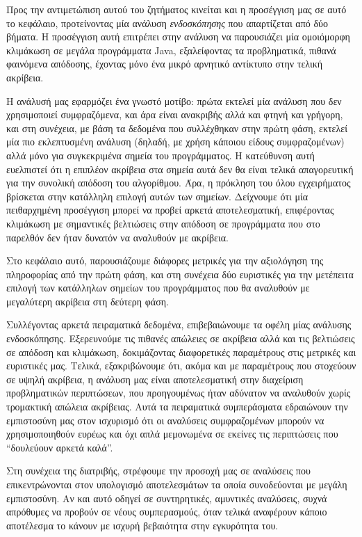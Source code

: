 Προς την αντιμετώπιση αυτού του ζητήματος κινείται και η προσέγγιση μας σε αυτό το κεφάλαιο, προτείνοντας μία ανάλυση \emph{ενδοσκόπησης} που απαρτίζεται από δύο βήματα. Η προσέγγιση αυτή επιτρέπει στην ανάλυση να παρουσιάζει μία ομοιόμορφη κλιμάκωση σε μεγάλα προγράμματα {\en Java}, εξαλείφοντας τα προβληματικά, πιθανά φαινόμενα απόδοσης, έχοντας μόνο ένα μικρό αρνητικό αντίκτυπο στην τελική ακρίβεια.

Η ανάλυσή μας εφαρμόζει ένα γνωστό μοτίβο: πρώτα εκτελεί μία ανάλυση που δεν χρησιμοποιεί συμφραζόμενα, και άρα είναι ανακριβής αλλά και φτηνή και γρήγορη, και στη συνέχεια, με βάση τα δεδομένα που συλλέχθηκαν στην πρώτη φάση, εκτελεί μία πιο εκλεπτυσμένη ανάλυση (δηλαδή, με χρήση κάποιου είδους συμφραζομένων) αλλά μόνο για συγκεκριμένα σημεία του προγράμματος. Η κατεύθυνση αυτή ευελπιστεί ότι η επιπλέον ακρίβεια στα σημεία αυτά δεν θα είναι τελικά απαγορευτική για την συνολική απόδοση του αλγορίθμου. Άρα, η πρόκληση του όλου εγχειρήματος βρίσκεται στην κατάλληλη επιλογή αυτών των σημείων. Δείχνουμε ότι μία πειθαρχημένη προσέγγιση μπορεί να προβεί αρκετά αποτελεσματική, επιφέροντας κλιμάκωση με σημαντικές βελτιώσεις στην απόδοση σε προγράμματα που στο παρελθόν δεν ήταν δυνατόν να αναλυθούν με ακρίβεια.

Στο κεφάλαιο αυτό, παρουσιάζουμε διάφορες μετρικές για την αξιολόγηση της πληροφορίας από την πρώτη φάση, και στη συνέχεια δύο ευριστικές για την μετέπειτα επιλογή των κατάλληλων σημείων του προγράμματος που θα αναλυθούν με μεγαλύτερη ακρίβεια στη δεύτερη φάση.

Συλλέγοντας αρκετά πειραματικά δεδομένα, επιβεβαιώνουμε τα οφέλη μίας ανάλυσης ενδοσκόπησης. Εξερευνούμε τις πιθανές απώλειες σε ακρίβεια αλλά και τις βελτιώσεις σε απόδοση και κλιμάκωση, δοκιμάζοντας διαφορετικές παραμέτρους στις μετρικές και ευριστικές μας. Τελικά, εξακριβώνουμε ότι, ακόμα και με παραμέτρους που στοχεύουν σε υψηλή ακρίβεια, η ανάλυση μας είναι αποτελεσματική στην διαχείριση προβληματικών περιπτώσεων, που προηγουμένως ήταν αδύνατον να αναλυθούν χωρίς τρομακτική απώλεια ακρίβειας. Αυτά τα πειραματικά συμπεράσματα εδραιώνουν την εμπιστοσύνη μας στον ισχυρισμό ότι οι αναλύσεις συμφραζομένων μπορούν να χρησιμοποιηθούν ευρέως και όχι απλά μεμονωμένα σε εκείνες τις περιπτώσεις που ``δουλεύουν αρκετά καλά''.


\vspace{5 mm}
Στη συνέχεια της διατριβής, στρέφουμε την προσοχή μας σε αναλύσεις που επικεντρώνονται στον υπολογισμό αποτελεσμάτων τα οποία συνοδεύονται με μεγάλη εμπιστοσύνη. Αν και αυτό οδηγεί σε συντηρητικές, αμυντικές αναλύσεις, συχνά απρόθυμες να προβούν σε νέους συμπερασμούς, όταν τελικά αναφέρουν κάποιο αποτέλεσμα το κάνουν με ισχυρή βεβαιότητα στην εγκυρότητα του.


